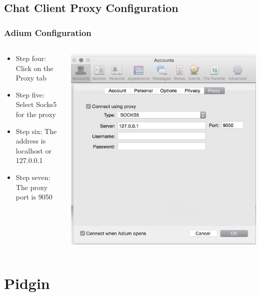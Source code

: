 \documentclass{beamer}
\begin{document}
\subsection{Chat Client Proxy Configuration}
\begin{frame}
\frametitle{Adium Configuration}
\begin{columns}
    \begin{column}{0.48\textwidth}
        \begin{itemize}
          \item Step four: Click on the Proxy tab
	 \item Step five: Select Socks5 for the proxy
	 \item Step six: The address is localhost or 127.0.0.1
	 \item Step seven: The proxy port is 9050
        \end{itemize}
    \end{column}
    \begin{column}{.5\textwidth}
        \includegraphics[width=.9\linewidth]{adium}
    \end{column}
\end{columns}
\end{frame}

\section{Pidgin}
\end{document}
